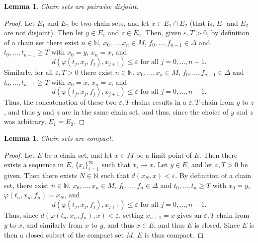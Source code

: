 \documentclass[11pt]{article}
\newtheorem{lem}[thm]{Lemma}
\begin{document}
\begin{lem}\label{chaindisjoint}
Chain sets are pairwise disjoint.
\end{lem}
\begin{proof}
Let $E_1$ and $E_2$ be two chain sets, and let $x\in E_1\cap E_2$ (that is, $E_1$ and $E_2$ are not disjoint).  Then let $y\in E_1$ and $z\in E_2$.  Then, given $\varepsilon, T>0$, by definition of a chain set there exist $n\in\mathbb{N}$, $x_0,\ldots,x_n\in M$, $f_0,\ldots,f_{n-1}\in\Delta$ and $t_0,\ldots,t_{n-1}\geq T$ with $x_0=y$, $x_n=x$, and 
$$d(\varphi(t_j,x_j,f_j),x_{j+1})\leq\varepsilon\mbox{ for all }j=0,\ldots,n-1.$$  Similarly, for all $\varepsilon, T>0$ there exist $n\in\mathbb{N}$, $x_0,\ldots,x_n\in M$, $f_0,\ldots,f_{n-1}\in\Delta$ and $t_0,\ldots,t_{n-1}\geq T$ with $x_0=x$, $x_n=z$, and 
$$d(\varphi(t_j,x_j,f_j),x_{j+1})\leq\varepsilon\mbox{ for all }j=0,\ldots,n-1.$$
Thus, the concatenation of these two $\varepsilon, T$-chains results in a $\varepsilon, T$-chain from $y$ to $z$, and thus $y$ and $z$ are in the same chain set, and thus, since the choice of $y$ and $z$ was arbitrary, $E_1=E_2$.  
\end{proof}

\begin{lem}  \label{compact}
Chain sets are compact.
\end{lem}
\begin{proof}
Let $E$ be a chain set, and let $x\in M$ be a limit point of $E$.  Then there exists a sequence in $E$, $\{x_i\}_{i=1}^\infty$ such that $x_i\rightarrow x$.  Let $y\in E$, and let $\varepsilon, T>0$ be given.  Then there exists $N\in\mathbb{N}$ such that $d(x_N,x)<\varepsilon$.  By definition of a chain set, there exist $n\in\mathbb{N}$, $x_0,\ldots,x_n\in M$, $f_0,\ldots,f_{n}\in\Delta$ and $t_0,\ldots,t_{n}\geq T$ with $x_0=y$, $\varphi(t_n,x_n,f_n)=x_N$, and 
$$d(\varphi(t_j,x_j,f_j),x_{j+1})\leq\varepsilon\mbox{ for all }j=0,\ldots,n-1.$$  
Thus, since $d(\varphi(t_n,x_n,f_n),x)<\varepsilon$, setting $x_{n+1}=x$ gives an $\varepsilon, T$-chain from $y$ to $x$, and similarly from $x$ to $y$, and thus $x\in E$, and thus $E$ is closed.  Since $E$ is then a closed subset of the compact set $M$, $E$ is thus compact. 
\end{proof}
\end{document}
